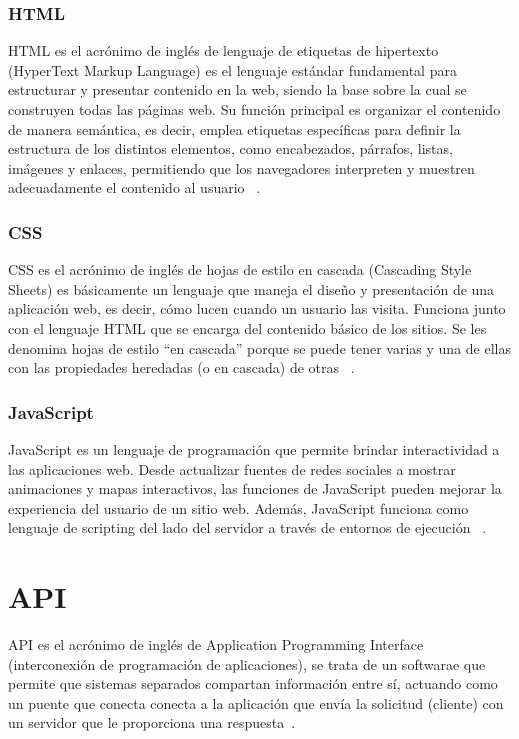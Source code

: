 \subsubsection{HTML}
HTML es el acrónimo de inglés de lenguaje de etiquetas de hipertexto (HyperText Markup Language) es el lenguaje estándar fundamental para estructurar y presentar contenido en la web, siendo la base sobre la cual se construyen todas las páginas web. Su función principal es organizar el contenido de manera semántica, es decir, emplea etiquetas específicas para definir la estructura de los distintos elementos, como encabezados, párrafos, listas, imágenes y enlaces, permitiendo que los navegadores interpreten y muestren adecuadamente el contenido al usuario ~\cite{HTMLMDN}.

\subsubsection{CSS}
CSS es el acrónimo de inglés de hojas de estilo en cascada (Cascading Style Sheets) es básicamente un lenguaje que maneja el diseño y presentación de una aplicación web, es decir, cómo lucen cuando un usuario las visita. Funciona junto con el lenguaje HTML que se encarga del contenido básico de los sitios. Se les denomina hojas de estilo “en cascada” porque se puede tener varias y una de ellas con las propiedades heredadas (o en cascada) de otras ~\cite{CSSMDN}.  

\subsubsection{JavaScript}
JavaScript es un lenguaje de programación que permite brindar interactividad a las aplicaciones web. Desde actualizar fuentes de redes sociales a mostrar animaciones y mapas interactivos, las funciones de JavaScript pueden mejorar la experiencia del usuario de un sitio web. Además, JavaScript funciona como lenguaje de scripting del lado del servidor a través de entornos de ejecución ~\cite{JavascriptMDN}.

\section{API}
API es el acrónimo de inglés de Application Programming Interface (interconexión de programación de aplicaciones), se trata de un softwarae  que permite que sistemas separados compartan información entre sí, actuando como un puente que conecta conecta a la aplicación que envía la solicitud (cliente) con un servidor que le proporciona una respuesta~\cite{APIDazzet}. 

